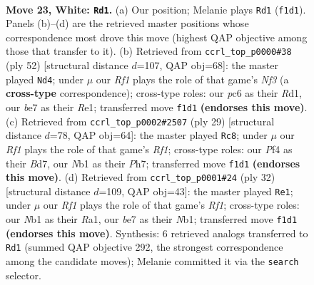 \documentclass[11pt]{article}
\begin{document}
\clearpage

\begin{figure}[p]\centering
\begin{subfigure}{0.46\textwidth}\centering
\resizebox{\linewidth}{!}{%
\newchessgame
\chessboard[
  setfen={r1b1r1k1/p2nb2p/2p5/3q2p1/Pp1p1P2/1P1Q2P1/3NPK2/RNB2R2 w - - 0 23},
  showmover=false,
  pgfstyle=straightmove, color=movearrow, markmove={f1-d1}
]}
\caption{}
\end{subfigure}\hfill
\begin{subfigure}{0.46\textwidth}\centering
\resizebox{\linewidth}{!}{%
\newchessgame
\chessboard[
  setfen={2bn1r1k/1pp1q1b1/r5pp/p3P3/P1N1Qp2/2P2N2/1P3P1P/3RRBK1 w - - 17 27},
  showmover=false,
  pgfstyle=straightmove, color=movearrow, markmove={f3-d4}
]}
\caption{}
\end{subfigure}
\\[4pt]
\begin{subfigure}{0.46\textwidth}\centering
\resizebox{\linewidth}{!}{%
\newchessgame
\chessboard[
  setfen={rn3rk1/3b1ppp/1p2p3/2n1q3/2B5/P3PP2/1PQ1N1PP/1RB1K2R b K - 6 15},
  showmover=false,
  pgfstyle=straightmove, color=movearrow, markmove={f8-c8}
]}
\caption{}
\end{subfigure}\hfill
\begin{subfigure}{0.46\textwidth}\centering
\resizebox{\linewidth}{!}{%
\newchessgame
\chessboard[
  setfen={r1b1k2r/pp1qnppp/1b1p4/3P4/8/B4N2/P3QPPP/RN3RK1 w kq - 1 17},
  showmover=false,
  pgfstyle=straightmove, color=movearrow, markmove={f1-e1}
]}
\caption{}
\end{subfigure}
\caption{\textbf{Move 23, White: \texttt{Rd1}.} (a) Our position; Melanie plays \texttt{Rd1} (\texttt{f1d1}). Panels (b)--(d) are the retrieved master positions whose correspondence most drove this move (highest QAP objective among those that transfer to it). (b) Retrieved from \texttt{ccrl\_top\_p0000\#38} (ply 52) [structural distance $d$=107, QAP obj=68]: the master played \texttt{Nd4}; under $\mu$ our \emph{Rf1} plays the role of that game's \emph{Nf3} (a \textbf{cross-type} correspondence); cross-type roles: our \emph{p}c6 as their \emph{R}d1, our \emph{b}e7 as their \emph{R}e1; transferred move \texttt{f1d1} \textbf{(endorses this move)}. (c) Retrieved from \texttt{ccrl\_top\_p0002\#2507} (ply 29) [structural distance $d$=78, QAP obj=64]: the master played \texttt{Rc8}; under $\mu$ our \emph{Rf1} plays the role of that game's \emph{Rf1}; cross-type roles: our \emph{P}f4 as their \emph{B}d7, our \emph{N}b1 as their \emph{P}h7; transferred move \texttt{f1d1} \textbf{(endorses this move)}. (d) Retrieved from \texttt{ccrl\_top\_p0001\#24} (ply 32) [structural distance $d$=109, QAP obj=43]: the master played \texttt{Re1}; under $\mu$ our \emph{Rf1} plays the role of that game's \emph{Rf1}; cross-type roles: our \emph{N}b1 as their \emph{R}a1, our \emph{b}e7 as their \emph{N}b1; transferred move \texttt{f1d1} \textbf{(endorses this move)}. Synthesis: 6 retrieved analogs transferred to \texttt{Rd1} (summed QAP objective 292, the strongest correspondence among the candidate moves); Melanie committed it via the \texttt{search} selector.}
\label{fig:thought-m44}
\end{figure}
\end{document}
